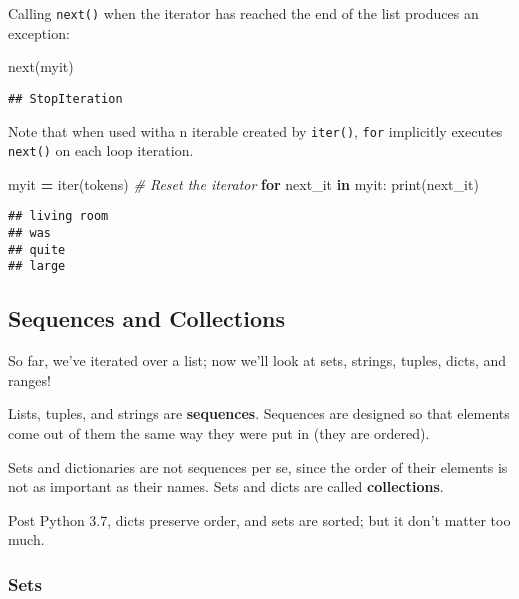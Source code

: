 \documentclass[
]{book}
\newenvironment{Shaded}{\begin{snugshade}}{\end{snugshade}}
\newcommand{\BuiltInTok}[1]{#1}
\newcommand{\CommentTok}[1]{\textcolor[rgb]{0.56,0.35,0.01}{\textit{#1}}}
\newcommand{\ControlFlowTok}[1]{\textcolor[rgb]{0.13,0.29,0.53}{\textbf{#1}}}
\newcommand{\KeywordTok}[1]{\textcolor[rgb]{0.13,0.29,0.53}{\textbf{#1}}}
\newcommand{\NormalTok}[1]{#1}
\newcommand{\OperatorTok}[1]{\textcolor[rgb]{0.81,0.36,0.00}{\textbf{#1}}}
\begin{document}
Calling \texttt{next()} when the iterator has reached the end of the list produces an exception:

\begin{Shaded}
\begin{Highlighting}[]
\BuiltInTok{next}\NormalTok{(myit)}
\end{Highlighting}
\end{Shaded}

\begin{verbatim}
## StopIteration
\end{verbatim}

Note that when used witha n iterable created by \texttt{iter()}, \texttt{for} implicitly executes \texttt{next()} on each loop iteration.

\begin{Shaded}
\begin{Highlighting}[]
\NormalTok{myit }\OperatorTok{=} \BuiltInTok{iter}\NormalTok{(tokens) }\CommentTok{\# Reset the iterator}
\ControlFlowTok{for}\NormalTok{ next\_it }\KeywordTok{in}\NormalTok{ myit:}
    \BuiltInTok{print}\NormalTok{(next\_it)}
\end{Highlighting}
\end{Shaded}

\begin{verbatim}
## living room
## was
## quite
## large
\end{verbatim}

\subsection{Sequences and Collections}\label{sequences-and-collections}

So far, we've iterated over a list; now we'll look at sets, strings, tuples, dicts, and ranges!

Lists, tuples, and strings are \textbf{sequences}. Sequences are designed so that elements come out of them the same way they were put in (they are ordered).

Sets and dictionaries are not sequences per se, since the order of their elements is not as important as their names. Sets and dicts are called \textbf{collections}.

Post Python 3.7, dicts preserve order, and sets are sorted; but it don't matter too much.

\subsubsection{Sets}\label{sets}
\end{document}
